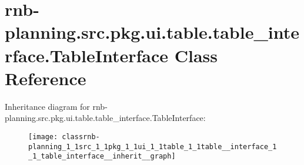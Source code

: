 \hypertarget{classrnb-planning_1_1src_1_1pkg_1_1ui_1_1table_1_1table__interface_1_1_table_interface}{}\section{rnb-\/planning.src.\+pkg.\+ui.\+table.\+table\+\_\+interface.\+Table\+Interface Class Reference}
\label{classrnb-planning_1_1src_1_1pkg_1_1ui_1_1table_1_1table__interface_1_1_table_interface}


Inheritance diagram for rnb-\/planning.src.\+pkg.\+ui.\+table.\+table\+\_\+interface.\+Table\+Interface\+:\nopagebreak
\begin{figure}[H]
\begin{center}
\leavevmode
\texttt{[image: classrnb-planning\_1\_1src\_1\_1pkg\_1\_1ui\_1\_1table\_1\_1table\_\_interface\_1\_1\_table\_interface\_\_inherit\_\_graph]}
\end{center}
\end{figure}
